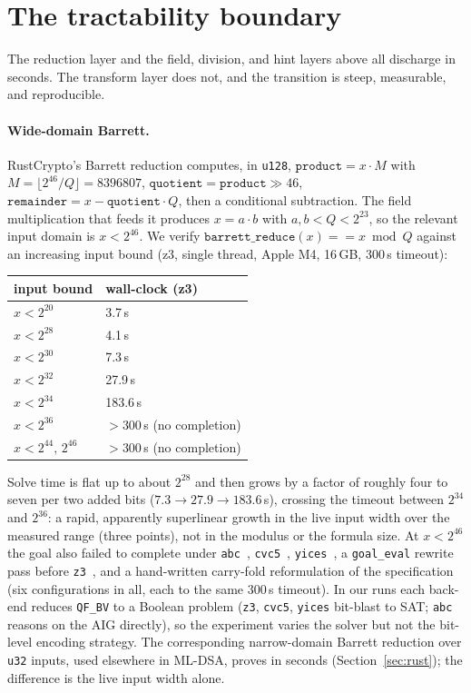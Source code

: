 \documentclass[11pt]{article}
\newcommand{\code}[1]{\texttt{#1}}
\begin{document}
\section{The tractability boundary}\label{sec:boundary}

The reduction layer and the field, division, and hint layers above all discharge in seconds. The
transform layer does not, and the transition is steep, measurable, and reproducible.

\paragraph{Wide-domain Barrett.} RustCrypto's Barrett reduction computes, in \code{u128},
$\code{product} = x \cdot M$ with $M = \lfloor 2^{46}/Q \rfloor = 8396807$, $\code{quotient} =
\code{product} \gg 46$, $\code{remainder} = x - \code{quotient} \cdot Q$, then a conditional subtraction.
The field multiplication that feeds it produces $x = a \cdot b$ with $a, b < Q < 2^{23}$, so the relevant
input domain is $x < 2^{46}$. We verify $\code{barrett\_reduce}(x) == x \bmod Q$ against an increasing
input bound (z3, single thread, Apple M4, 16\,GB, 300\,s timeout):
\begin{center}
\begin{tabular}{ll}
\hline
input bound & wall-clock (z3) \\
\hline
$x < 2^{20}$ & 3.7\,s \\
$x < 2^{28}$ & 4.1\,s \\
$x < 2^{30}$ & 7.3\,s \\
$x < 2^{32}$ & 27.9\,s \\
$x < 2^{34}$ & 183.6\,s \\
$x < 2^{36}$ & $>300$\,s (no completion) \\
$x < 2^{44},\, 2^{46}$ & $>300$\,s (no completion) \\
\hline
\end{tabular}
\end{center}
Solve time is flat up to about $2^{28}$ and then grows by a factor of roughly four to seven per two
added bits ($7.3 \to 27.9 \to 183.6$\,s), crossing the timeout between $2^{34}$ and $2^{36}$: a rapid,
apparently superlinear growth in the live input width over the measured range (three points), not in the
modulus or the formula size. At $x < 2^{46}$ the goal also failed to
complete under \code{abc}~\cite{abc}, \code{cvc5}~\cite{cvc5}, \code{yices}~\cite{yices}, a
\code{goal\_eval} rewrite pass before \code{z3}~\cite{z3}, and a hand-written carry-fold reformulation of
the specification (six configurations in all, each to the
same 300\,s timeout). In our runs each back-end reduces \code{QF\_BV} to a Boolean problem (\code{z3},
\code{cvc5}, \code{yices} bit-blast to SAT; \code{abc} reasons on the AIG directly), so the experiment
varies the solver but not the bit-level encoding strategy. The corresponding narrow-domain Barrett reduction over
\code{u32} inputs, used elsewhere in ML-DSA, proves in seconds (Section~\ref{sec:rust}); the difference is
the live input width alone.
\end{document}
